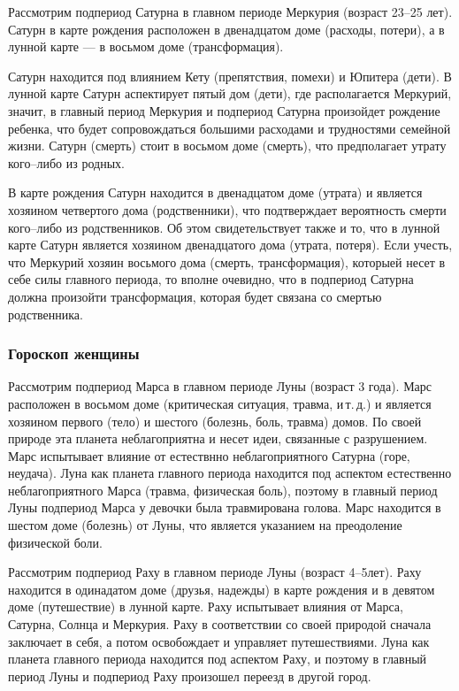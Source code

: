 Рассмотрим подпериод Сатурна в главном периоде Меркурия (возраст 23--25 лет). Сатурн в карте рождения расположен в двенадцатом доме (расходы, потери), а в лунной карте --- в восьмом доме (трансформация).

Сатурн находится под влиянием Кету (препятствия, помехи) и Юпитера (дети). В лунной карте Сатурн аспектирует пятый дом (дети), где располагается Меркурий, значит, в главный период Меркурия и подпериод Сатурна произойдет рождение ребенка, что будет сопровождаться большими расходами и трудностями семейной жизни. Сатурн (смерть) стоит в восьмом доме (смерть), что предполагает утрату кого--либо из родных.

В карте рождения Сатурн находится в двенадцатом доме (утрата) и является хозяином четвертого дома (родственники), что подтверждает вероятность смерти кого--либо из родственников. Об этом свидетельствует также и то, что в лунной карте Сатурн является хозяином двенадцатого дома (утрата, потеря). Если учесть, что Меркурий хозяин восьмого дома (смерть, трансформация), которыей несет в себе силы главного периода, то вполне очевидно, что в подпериод Сатурна должна произойти трансформация, которая будет связана со смертью родственника.

\subsubsection*{Гороскоп женщины}

\natal[%
	asc=8,
	one=ЮПИТЕР,
	two=САТУРН,
	three=ЛУНА,
	five=СОЛНЦЕ\\меркурий\\КЕТУ,
	six=ВЕНЕРА,
	eight=МАРС,
	eleven=РАХУ
]{}

Рассмотрим подпериод Марса в главном периоде Луны (возраст 3 года). Марс расположен в восьмом доме (критическая ситуация, травма, и\,т.\,д.) и является хозяином первого (тело) и шестого (болезнь, боль, травма) домов. По своей природе эта планета неблагоприятна и несет идеи, связанные с разрушением. Марс испытывает влияние от естествнно неблагоприятного Сатурна (горе, неудача). Луна как планета главного периода находится под аспектом естественно неблагоприятного Марса (травма, физическая боль), поэтому в главный период Луны подпериод Марса у девочки была травмирована голова. Марс находится в шестом доме (болезнь) от Луны, что является указанием на преодоление физической боли.

Рассмотрим подпериод Раху в главном периоде Луны (возраст 4--5лет). Раху находится в одинадатом доме (друзья, надежды) в карте рождения и в девятом доме (путешествие) в лунной карте. Раху испытывает влияния от Марса, Сатурна, Солнца и Меркурия. Раху в соответствии со своей природой сначала заключает в себя, а потом освобождает и управляет путешествиями. Луна как планета главного периода находится под аспектом Раху, и поэтому в главный период Луны и подпериод Раху произошел переезд в другой город.

